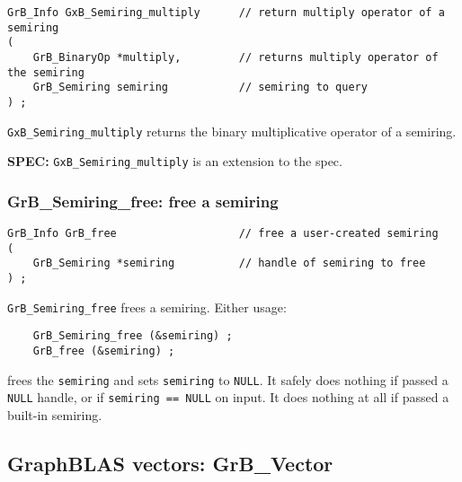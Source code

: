 \documentclass[12pt]{article}
\begin{document}
\begin{mdframed}[userdefinedwidth=6in]
{\footnotesize
\begin{verbatim}
GrB_Info GxB_Semiring_multiply      // return multiply operator of a semiring
(
    GrB_BinaryOp *multiply,         // returns multiply operator of the semiring
    GrB_Semiring semiring           // semiring to query
) ;
\end{verbatim}
} \end{mdframed}

\verb'GxB_Semiring_multiply' returns the binary multiplicative operator of a
semiring.

\begin{spec}
{\bf SPEC:} \verb'GxB_Semiring_multiply' is an extension to the spec.
\end{spec}


\subsubsection{{\sf GrB\_Semiring\_free:} free a semiring}
\label{semiring_free}

\begin{mdframed}[userdefinedwidth=6in]
{\footnotesize
\begin{verbatim}
GrB_Info GrB_free                   // free a user-created semiring
(
    GrB_Semiring *semiring          // handle of semiring to free
) ;
\end{verbatim}
} \end{mdframed}

\verb'GrB_Semiring_free' frees a semiring.  Either usage:

    {\small
    \begin{verbatim}
    GrB_Semiring_free (&semiring) ;
    GrB_free (&semiring) ; \end{verbatim}}

\noindent
frees the \verb'semiring' and sets \verb'semiring' to \verb'NULL'.  It safely
does nothing if passed a \verb'NULL' handle, or if \verb'semiring == NULL' on
input.  It does nothing at all if passed a built-in semiring.

\newpage
\subsection{GraphBLAS vectors: {\sf GrB\_Vector}} %
\label{vector}
\end{document}
